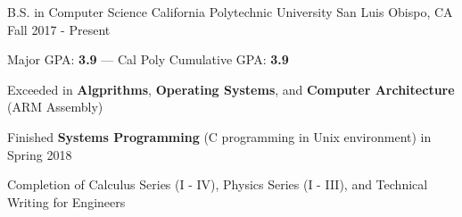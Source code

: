 

\begin{cventries}

  \cventry
    {B.S. in Computer Science} %
    {California Polytechnic University} %
    {San Luis Obispo, CA} %
    {Fall 2017 - Present} %
    {
      \begin{cvitems} %
        \item {Major GPA: \textbf{3.9} --- Cal Poly Cumulative GPA: \textbf{3.9}}
        \item {Exceeded in \textbf{Algprithms}, \textbf{Operating Systems}, and \textbf{Computer Architecture} (ARM Assembly)}
        \item {Finished \textbf{Systems Programming} (C programming in Unix environment) in Spring 2018}
        \item {Completion of Calculus Series (I - IV), Physics Series (I - III), and Technical Writing for Engineers}
      \end{cvitems}
    }

\end{cventries}

